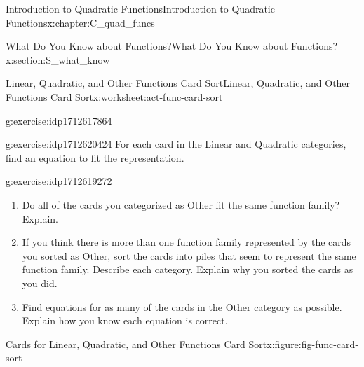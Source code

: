 \documentclass[oneside,10pt,]{book}
\numberwithin{equation}{chapter}
\begin{document}
\begin{chapterptx}{Introduction to Quadratic Functions}{}{Introduction to Quadratic Functions}{}{}{x:chapter:C_quad_funcs}
\begin{sectionptx}{What Do You Know about Functions?}{}{What Do You Know about Functions?}{}{}{x:section:S_what_know}
\begin{worksheet-subsection}{Linear, Quadratic, and Other Functions Card Sort}{}{Linear, Quadratic, and Other Functions Card Sort}{}{}{x:worksheet:act-func-card-sort}
\begin{divisionexercise}{3}{}{}{g:exercise:idp1712617864}
\end{divisionexercise}%
\begin{divisionexercise}{4}{}{}{g:exercise:idp1712620424}%
For each card in the Linear and Quadratic categories, find an equation to fit the representation.%
\end{divisionexercise}%
\begin{divisionexercise}{5}{}{}{g:exercise:idp1712619272}%
\begin{enumerate}[font=\bfseries,label=(\alph*),ref=\alph*]
\item{}Do all of the cards you categorized as Other fit the same function family? Explain.%
\item{}If you think there is more than one function family represented by the cards you sorted as Other, sort the cards into piles that seem to represent the same function family. Describe each category. Explain why you sorted the cards as you did.%
\item{}Find equations for as many of the cards in the Other category as possible. Explain how you know each equation is correct.%
\end{enumerate}
\end{divisionexercise}%
\clearpage
\begin{figureptx}{Cards for \hyperref[x:worksheet:act-func-card-sort]{Linear, Quadratic, and Other Functions Card Sort}}{x:figure:fig-func-card-sort}{}%
\begin{image}{0}{1}{0}%

\end{image}
\end{figureptx}
\end{worksheet-subsection}
\end{sectionptx}
\end{chapterptx}
\end{document}
